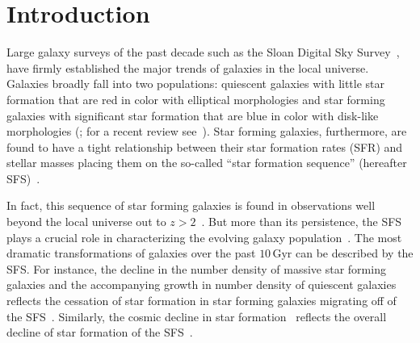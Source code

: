 \documentclass[preprint2,tighten]{aastex62}
\newcommand{\todo}[1]{{\bf \textcolor{red}{ #1}}}
\begin{document}
\section{Introduction}
Large galaxy surveys of the past decade such as the Sloan Digital Sky 
Survey~\citep[SDSS;][]{york2000}, have firmly established the major 
trends of galaxies in the local universe. Galaxies %
broadly fall into two populations: quiescent galaxies with little star
formation that are red in color with elliptical morphologies and star 
forming galaxies with significant star formation that are blue in color 
with disk-like morphologies 
(\citealt{kauffmann2003, blanton2003, baldry2006, taylor2009, moustakas2013}; 
for a recent review see~\citealt{blanton2009}). 
Star forming galaxies, furthermore, are found to have a tight relationship 
between their star formation rates (SFR) and stellar masses placing them
on the so-called ``star formation sequence'' (hereafter 
SFS)~\citep[\emph{e.g.}][]{noeske2007, daddi2007, salim2007}.


In fact, this sequence of star forming galaxies is found in observations 
well beyond the local universe out to $z > 2$~\citep{wang2013, schreiber2015}.
But more than its persistence, the SFS plays a crucial role in characterizing 
the evolving galaxy population~\citep[but see also][]{leja2015}. The most dramatic transformations of 
galaxies over the past $10\,\mathrm{Gyr}$ can be described by the SFS. 
For instance, the decline in the number density of massive 
star forming galaxies and the accompanying growth in number density of 
quiescent galaxies reflects the cessation of star formation in 
star forming galaxies migrating off of the 
SFS~\citep{blanton2006, borch2006, bundy2006, moustakas2013}. 
Similarly, the cosmic decline in star formation~\citep{hopkins2006,
behroozi2013a, madau2014} reflects the overall decline of star 
formation of the SFS~\citep{schreiber2015}. 
\end{document}
